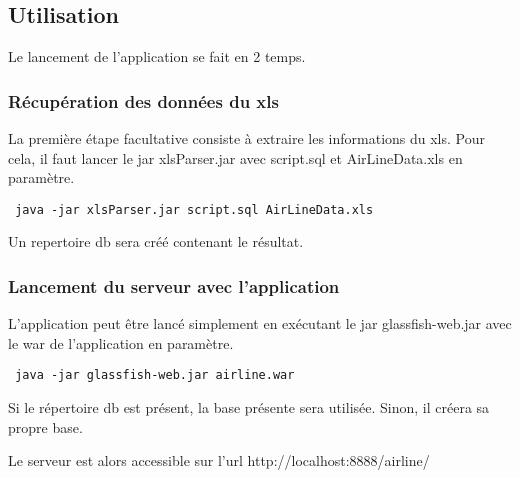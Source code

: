 \subsection*{Utilisation}
Le lancement de l'application se fait en 2 temps.
\subsubsection*{Récupération des données du xls}
La première étape facultative consiste à extraire les informations du xls. Pour cela, il faut lancer le jar xlsParser.jar avec script.sql et AirLineData.xls en paramètre. 
\begin{verbatim}
 java -jar xlsParser.jar script.sql AirLineData.xls
\end{verbatim}
Un repertoire db sera créé contenant le résultat.
\subsubsection*{Lancement du serveur avec l'application}
L'application peut être lancé simplement en exécutant le jar glassfish-web.jar avec le war de l'application en paramètre. 
\begin{verbatim}
 java -jar glassfish-web.jar airline.war
\end{verbatim}
Si le répertoire db est présent, la base présente sera utilisée. Sinon, il créera sa propre base.

Le serveur est alors accessible sur l'url http://localhost:8888/airline/